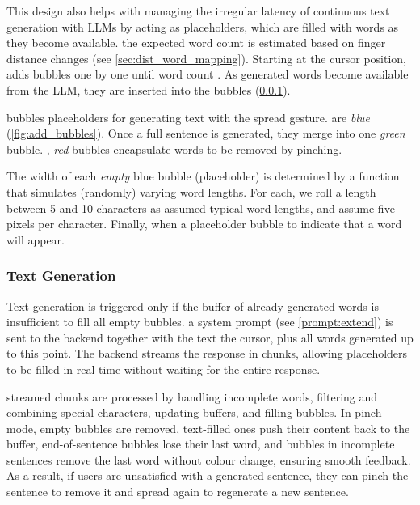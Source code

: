 This design also helps with managing the irregular latency of continuous text generation with LLMs by acting as placeholders, which are filled with words as they become available.
 the expected word count is estimated based on finger distance changes (see \cref{sec:dist_word_mapping}).
Starting at the cursor position,  adds bubbles one by one until  word count . %
As  generated words become available from the LLM, they are inserted into the bubbles (\cref{sec:impl_text_generation}).

 bubbles  placeholders for generating text with the spread gesture.  are \textit{blue} (\cref{fig:add_bubbles}).
Once a full sentence is generated, they merge into one \textit{green} bubble. 
, \textit{red} bubbles encapsulate words to be removed by pinching.

The width of each \textit{empty} blue bubble (placeholder) is determined by a function that simulates (randomly) varying word lengths. %
For each, we roll a length between 5 and 10 characters as assumed typical word lengths, and assume five pixels per character. 
Finally, when a placeholder bubble  to indicate that a word will appear. %


\subsubsection{Text Generation}\label{sec:impl_text_generation}
 Text generation is triggered only if the buffer of already generated words is insufficient to fill all empty bubbles.  a system prompt (see \cref{prompt:extend}) is sent to the backend together with the text   the cursor, plus all words generated up to this point.
The backend streams the response in chunks, allowing placeholders to be filled in real-time without waiting for the entire response.

 streamed chunks are processed by handling incomplete words, filtering and combining special characters, updating buffers, and filling bubbles. %
In pinch mode, empty bubbles are removed, text-filled ones push their content back to the buffer, end-of-sentence bubbles lose their last word, and bubbles in incomplete sentences remove the last word without colour change, ensuring smooth feedback.
As a result, if users are unsatisfied with a generated sentence, they can pinch the sentence to remove it and spread again to regenerate a new sentence.

